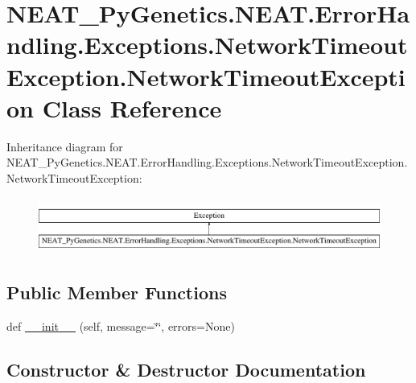 \hypertarget{classNEAT__PyGenetics_1_1NEAT_1_1ErrorHandling_1_1Exceptions_1_1NetworkTimeoutException_1_1NetworkTimeoutException}{}\section{N\+E\+A\+T\+\_\+\+Py\+Genetics.\+N\+E\+A\+T.\+Error\+Handling.\+Exceptions.\+Network\+Timeout\+Exception.\+Network\+Timeout\+Exception Class Reference}
\label{classNEAT__PyGenetics_1_1NEAT_1_1ErrorHandling_1_1Exceptions_1_1NetworkTimeoutException_1_1NetworkTimeoutException}
Inheritance diagram for N\+E\+A\+T\+\_\+\+Py\+Genetics.\+N\+E\+A\+T.\+Error\+Handling.\+Exceptions.\+Network\+Timeout\+Exception.\+Network\+Timeout\+Exception\+:\begin{figure}[H]
\begin{center}
\leavevmode
\includegraphics[height=1.848185cm]{classNEAT__PyGenetics_1_1NEAT_1_1ErrorHandling_1_1Exceptions_1_1NetworkTimeoutException_1_1NetworkTimeoutException}
\end{center}
\end{figure}
\subsection*{Public Member Functions}
\begin{DoxyCompactItemize}
\item 
def \hyperlink{classNEAT__PyGenetics_1_1NEAT_1_1ErrorHandling_1_1Exceptions_1_1NetworkTimeoutException_1_1NetworkTimeoutException_ac78b36042b085235de601a15a68ce98a}{\+\_\+\+\_\+init\+\_\+\+\_\+} (self, message=\char`\"{}\char`\"{}, errors=None)
\end{DoxyCompactItemize}


\subsection{Constructor \& Destructor Documentation}
